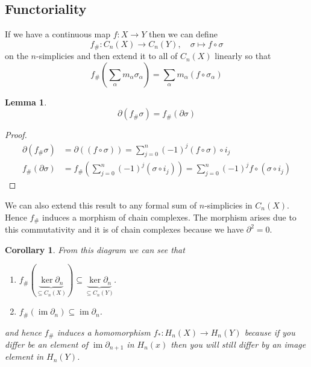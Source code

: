 \documentclass[11pt]{article}
\DeclareMathOperator{\im}{\mathrm{im}}
\newcommand{\mdf}[1]{{\color{red} #1}}
\newtheorem{cor}[theorem]{Corollary}
\newtheorem{lemma}[theorem]{Lemma}
\begin{document}
\subsection{Functoriality}
If we have a continuous map $f:X\to Y$ then we can define
\[
	f_\#:C_n(X)\to C_n(Y),\quad \sigma\mapsto f\circ\sigma
\]
on the $n$-simplicies and then extend it to all of $C_n(X)$ linearly so that
\[
	f_\#\left(\sum_{\alpha}m_\alpha \sigma_\alpha\right)=\sum_{\alpha}m_\alpha \left(f \circ \sigma_\alpha\right)
\]

\begin{lemma}
\[
	\partial(f_\#\sigma)=f_\#(\partial\sigma)
\]
\end{lemma}

\begin{proof}
\begin{align*}
	\partial(f_\#\sigma)&=\partial((f\circ\sigma))=\sum_{j=0}^{n}(-1)^j(f\circ\sigma)\circ i_j \\
	f_\#(\partial\sigma)&=f_\#\left(\sum_{j=0}^{n}(-1)^j(\sigma\circ i_j)\right)=\sum_{j=0}^{n}(-1)^j f\circ (\sigma \circ i_j)
\end{align*}
\end{proof}

We can also extend this result to any formal sum of $n$-simplicies in $C_n(X)$.
Hence $f_\#$ induces a \mdf{morphism of chain complexes}.
The morphism arises due to this commutativity and it is of chain complexes because we have $\partial^2=0$.
\begin{figure}[h]
	\centering
{}
\end{figure}

\begin{cor}
From this diagram we can see that
\begin{enumerate}
	\item $f_\#(\underbrace{\ker\partial_n}_{\subseteq C_n(X)})\subseteq\underbrace{\ker\partial_n}_{\subseteq C_n(Y)}$.
	\item $f_\#(\im\partial_n)\subseteq \im\partial_n$.
\end{enumerate}
and hence $f_\#$ induces a homomorphism $f_\ast:H_n(X)\to H_n(Y)$ because if you differ be an element of $\im\partial_{n+1}$ in $H_n(x)$ then you will still differ by an image element in $H_n(Y)$.
\end{cor}
\end{document}
